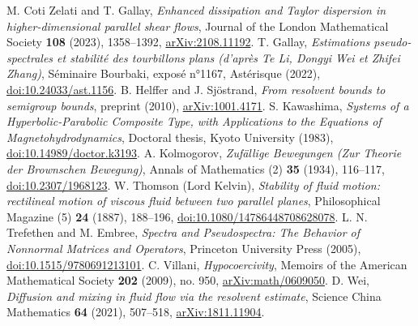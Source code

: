 \documentclass[11pt]{article}
\theoremstyle{definition}
\theoremstyle{remark}
\begin{document}
\begin{thebibliography}{}
 M. Coti Zelati and T. Gallay, \emph{Enhanced dissipation and Taylor dispersion in higher-dimensional parallel shear flows}, Journal of the London Mathematical Society \textbf{108} (2023), 1358–1392, \href{https://arxiv.org/abs/2108.11192}{arXiv:2108.11192}.
 T. Gallay, \emph{Estimations pseudo-spectrales et stabilité des tourbillons plans (d'après Te Li, Dongyi Wei et Zhifei Zhang)}, Séminaire Bourbaki, exposé n°1167, Astérisque (2022), \href{https://doi.org/10.24033/ast.1156}{doi:10.24033/ast.1156}.
 B. Helffer and J. Sjöstrand, \emph{From resolvent bounds to semigroup bounds}, preprint (2010), \href{https://arxiv.org/abs/1001.4171}{arXiv:1001.4171}.
 S. Kawashima, \emph{Systems of a Hyperbolic-Parabolic Composite Type, with Applications to the Equations of Magnetohydrodynamics}, Doctoral thesis, Kyoto University (1983), \href{https://doi.org/10.14989/doctor.k3193}{doi:10.14989/doctor.k3193}.
 A. Kolmogorov, \emph{Zufällige Bewegungen (Zur Theorie der Brownschen Bewegung)}, Annals of Mathematics (2) \textbf{35} (1934), 116–117, \href{https://doi.org/10.2307/1968123}{doi:10.2307/1968123}.
 W. Thomson (Lord Kelvin), \emph{Stability of fluid motion: rectilineal motion of viscous fluid between two parallel planes}, Philosophical Magazine (5) \textbf{24} (1887), 188–196, \href{https://doi.org/10.1080/14786448708628078}{doi:10.1080/14786448708628078}.
 L. N. Trefethen and M. Embree, \emph{Spectra and Pseudospectra: The Behavior of Nonnormal Matrices and Operators}, Princeton University Press (2005), \href{https://doi.org/10.1515/9780691213101}{doi:10.1515/9780691213101}.
 C. Villani, \emph{Hypocoercivity}, Memoirs of the American Mathematical Society \textbf{202} (2009), no. 950, \href{https://arxiv.org/abs/math/0609050}{arXiv:math/0609050}.
 D. Wei, \emph{Diffusion and mixing in fluid flow via the resolvent estimate}, Science China Mathematics \textbf{64} (2021), 507–518, \href{https://arxiv.org/abs/1811.11904}{arXiv:1811.11904}.
\end{thebibliography}
\end{document}
